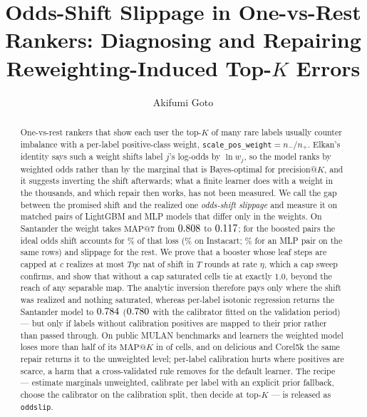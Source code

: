 \documentclass[sigconf,nonacm]{acmart}
\makeatletter
\newcommand{\mapk}{\mathrm{MAP}@K\xspace}
\newcommand{\mapseven}{\mathrm{MAP}@7\xspace}
\makeatother
\begin{document}
\title{Odds-Shift Slippage in One-vs-Rest Rankers: Diagnosing and Repairing Reweighting-Induced Top-$K$ Errors}

\author{Akifumi Goto}

\begin{abstract}
One-vs-rest rankers that show each user the top-$K$ of many rare labels usually counter imbalance with a per-label positive-class weight, \texttt{scale\_pos\_weight}$=n_-/n_+$. Elkan's identity says such a weight shifts label $j$'s log-odds by $\ln w_j$, so the model ranks by weighted odds rather than by the marginal that is Bayes-optimal for precision@$K$, and it suggests inverting the shift afterwards; what a finite learner does with a weight in the thousands, and which repair then works, has not been measured. We call the gap between the promised shift and the realized one \emph{odds-shift slippage} and measure it on matched pairs of LightGBM and MLP models that differ only in the weights. On Santander the weight takes $\mapseven$ from $0.808$ to $0.117$; for the boosted pairs the ideal odds shift accounts for \noddsShare\% of that loss (\nIoddsShare\% on Instacart; \nModdsShare\% for an MLP pair on the same rows) and slippage for the rest. We prove that a booster whose leaf steps are capped at $c$ realizes at most $T\eta c$ nat of shift in $T$ rounds at rate $\eta$, which a cap sweep confirms, and show that without a cap saturated cells tie at exactly $1.0$, beyond the reach of any separable map. The analytic inversion therefore pays only where the shift was realized and nothing saturated, whereas per-label isotonic regression returns the Santander model to $0.784$ ($0.780$ with the calibrator fitted on the validation period) --- but only if labels without calibration positives are mapped to their prior rather than passed through. On \nnMulan{} public MULAN benchmarks and \nnLearners{} learners the weighted model loses more than half of its $\mapk$ in \nnCollapseCells{} of \nnDoseCells{} cells, and on delicious and Corel5k the same repair returns it to the unweighted level; per-label calibration hurts where positives are scarce, a harm that a cross-validated rule removes for the default learner. The recipe --- estimate marginals unweighted, calibrate per label with an explicit prior fallback, choose the calibrator on the calibration split, then decide at top-$K$ --- is released as \texttt{oddslip}.
\end{abstract}
\end{document}
